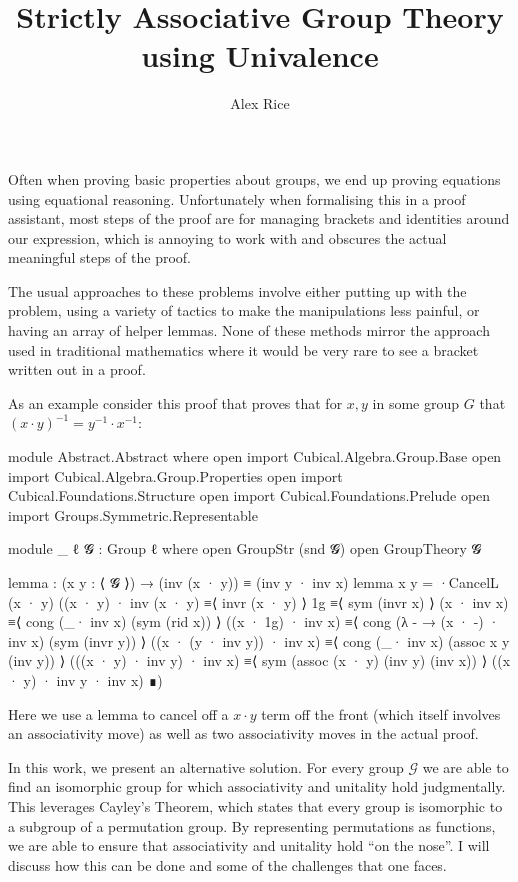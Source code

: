 \documentclass{article}
\title{Strictly Associative Group Theory using Univalence}
\author{Alex Rice}
\begin{document}
\maketitle

Often when proving basic properties about groups, we end up proving equations using equational reasoning. Unfortunately when formalising this in a proof assistant, most steps of the proof are for managing brackets and identities around our expression, which is annoying to work with and obscures the actual meaningful steps of the proof.

The usual approaches to these problems involve either putting up with the problem, using a variety of tactics to make the manipulations less painful, or having an array of helper lemmas. None of these methods mirror the approach used in traditional mathematics where it would be very rare to see a bracket written out in a proof.

As an example consider this proof that proves that for \(x,y\) in some group \(G\) that \((x \cdot y)^{-1} = y^{-1} \cdot x^{-1}\):

\begin{code}[hide]
module Abstract.Abstract where
open import Cubical.Algebra.Group.Base
open import Cubical.Algebra.Group.Properties
open import Cubical.Foundations.Structure
open import Cubical.Foundations.Prelude
open import Groups.Symmetric.Representable
\end{code}

\begin{code}
module _ {ℓ} {𝓖 : Group ℓ} where
  open GroupStr (snd 𝓖)
  open GroupTheory 𝓖

  lemma : (x y : ⟨ 𝓖 ⟩) → (inv (x · y)) ≡ (inv y · inv x)
  lemma x y = ·CancelL (x · y) ((x · y) · inv (x · y)
     ≡⟨ invr (x · y) ⟩
    1g
     ≡⟨ sym (invr x) ⟩
    (x · inv x)
     ≡⟨ cong (_· inv x) (sym (rid x)) ⟩
    ((x · 1g) · inv x)
     ≡⟨ cong (λ - → (x · -) · inv x) (sym (invr y)) ⟩
    ((x · (y · inv y)) · inv x)
     ≡⟨ cong (_· inv x) (assoc x y (inv y)) ⟩
    (((x · y) · inv y) · inv x)
     ≡⟨ sym (assoc (x · y) (inv y) (inv x)) ⟩
    ((x · y) · inv y · inv x) ∎)
\end{code}

Here we use a lemma to cancel off a \(x \cdot y\) term off the front (which itself involves an associativity move) as well as two associativity moves in the actual proof.

In this work, we present an alternative solution. For every group \(\mathcal{G}\) we are able to find an isomorphic group for which associativity and unitality hold judgmentally. This leverages Cayley's Theorem, which states that every group is isomorphic to a subgroup of a permutation group. By representing permutations as functions, we are able to ensure that associativity and unitality hold ``on the nose''. I will discuss how this can be done and some of the challenges that one faces.
\end{document}
